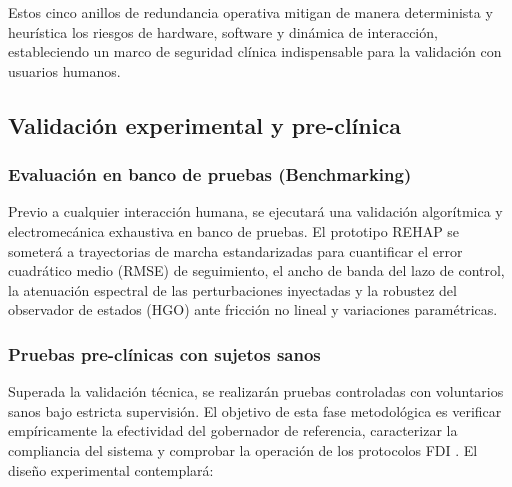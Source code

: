 \documentclass[a4paper,12pt]{article}
\begin{document}
Estos cinco anillos de redundancia operativa mitigan de manera determinista y heurística los riesgos de hardware, software y dinámica de interacción, estableciendo un marco de seguridad clínica indispensable para la validación con usuarios humanos.


\subsection{Validación experimental y pre-clínica}

\subsubsection{Evaluación en banco de pruebas (Benchmarking)}
Previo a cualquier interacción humana, se ejecutará una validación algorítmica y electromecánica exhaustiva en banco de pruebas. El prototipo REHAP se someterá a trayectorias de marcha estandarizadas para cuantificar el error cuadrático medio (RMSE) de seguimiento, el ancho de banda del lazo de control, la atenuación espectral de las perturbaciones inyectadas y la robustez del observador de estados (HGO) ante fricción no lineal y variaciones paramétricas.

\subsubsection{Pruebas pre-clínicas con sujetos sanos}
Superada la validación técnica, se realizarán pruebas controladas con voluntarios sanos bajo estricta supervisión. El objetivo de esta fase metodológica es verificar empíricamente la efectividad del gobernador de referencia, caracterizar la compliancia del sistema y comprobar la operación de los protocolos FDI \citep{cruz_methodology_2017}. El diseño experimental contemplará:
\end{document}
